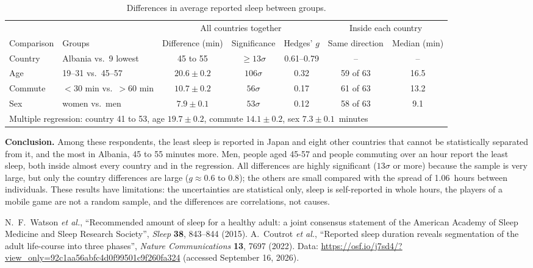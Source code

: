 \documentclass{article}
\begin{document}
\begin{table}[!ht]
\centering
\small
\setlength{\tabcolsep}{4pt}
\begin{tabular}{llccccc}
\toprule
 & & \multicolumn{3}{c}{All countries together} & 
\multicolumn{2}{c}{Inside each country} \\
Comparison & Groups & Difference (min) & Significance & Hedges' $g$ & Same direction & Median (min) \\
\midrule 
Country & Albania vs.\ 9 lowest & 45 to 55 & $\geq 13\sigma$ & 0.61--0.79 & -- & -- \\ 
Age & 19--31 vs.\ 45--57 & $20.6 \pm 0.2$ & $106\sigma$ & 0.32 & 59 of 63 & 16.5 \\
Commute & $<30$ min vs.\ $>60$ min & $10.7 \pm 0.2$ & $56\sigma$ & 0.17 & 61 of 63 & 13.2 \\
Sex & women vs.\ men & $7.9 \pm 0.1$ & $53\sigma$ & 0.12 & 58 of 63 & 9.1 \\
\midrule
\multicolumn{7}{l}{Multiple regression: country 41 to 53, age $19.7 \pm 0.2$, commute $14.1 \pm 0.2$, sex $7.3 \pm 0.1$~minutes} \\
\bottomrule
\end{tabular}
\caption{Differences in average reported sleep between groups.} 
\label{tab:groups}
\end{table}

\textbf{Conclusion.} Among these respondents, the least sleep is reported in Japan and eight other countries that cannot be statistically separated from it, and the most in Albania, 45 to 55 minutes more. Men, people aged 45-57 and people commuting over an hour report the least sleep, both inside almost every country and in the regression. All differences are highly significant ($13\sigma$ or more) because the sample is very large, but only the country differences are large ($g \approx 0.6$ to $0.8$); the others are small compared with the spread of 1.06~hours between individuals. These results have limitations: the uncertainties are statistical only, sleep is self-reported in whole hours, the players of a mobile game are not a random sample, and the differences are correlations, not causes. 

\footnotesize
\setlength{\bibsep}{0pt}
\begin{thebibliography}{9}
\raggedright
{} N.~F.~Watson \textit{et al.}, ``Recommended amount of sleep for a healthy adult: a joint consensus statement of the American Academy of Sleep Medicine and Sleep Research Society'', \textit{Sleep} \textbf{38}, 843--844 (2015). 
 A.~Coutrot \textit{et al.}, ``Reported sleep duration reveals segmentation of the adult life-course into three phases'',  
\textit{Nature Communications} \textbf{13}, 7697 (2022).
Data: \url{https://osf.io/j7sd4/?view_only=92c1aa56abfc4d0f99501c9f260fa324}
(accessed September 16, 2026).
\end{thebibliography} 
\end{document}
